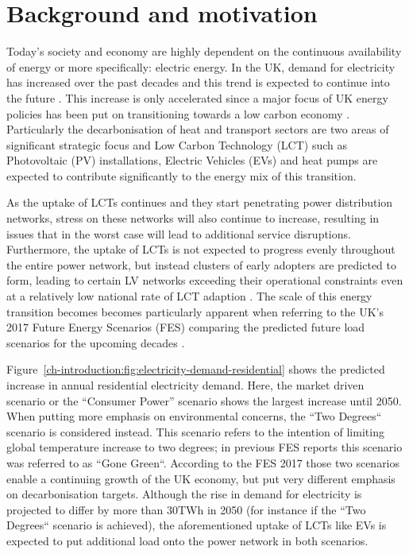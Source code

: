 \section{Background and motivation}
\label{ch-introduction:sec:background}

Today's society and economy are highly dependent on the continuous availability of energy or more specifically: electric energy.
In the UK, demand for electricity has increased over the past decades and this trend is expected to continue into the future \cite{HMGovernment2009}.
This increase is only accelerated since a major focus of UK energy policies has been put on transitioning towards a low carbon economy \cite{RoyalAcademyofEngineering2010}.
Particularly the decarbonisation of heat and transport sectors are two areas of significant strategic focus and Low Carbon Technology (LCT) such as Photovoltaic (PV) installations, Electric Vehicles (EVs) and heat pumps are expected to contribute significantly to the energy mix of this transition.


As the uptake of LCTs continues and they start penetrating power distribution networks, stress on these networks will also continue to increase, resulting in issues that in the worst case will lead to additional service disruptions.
Furthermore, the uptake of LCTs is not expected to progress evenly throughout the entire power network, but instead clusters of early adopters are predicted to form, leading to certain LV networks exceeding their operational constraints even at a relatively low national rate of LCT adaption \cite{Poghosyan2014}.
The scale of this energy transition becomes becomes particularly apparent when referring to the UK's 2017 Future Energy Scenarios (FES) comparing the predicted future load scenarios for the upcoming decades \cite{FES2017}.



Figure~\ref{ch-introduction:fig:electricity-demand-residential} shows the predicted increase in annual residential electricity demand.
Here, the market driven scenario or the ``Consumer Power'' scenario shows the largest increase until 2050.
When putting more emphasis on environmental concerns, the ``Two Degrees`` scenario is  considered instead.
This scenario refers to the intention of limiting global temperature increase to two degrees; in previous FES reports this scenario was referred to as ``Gone Green``.
According to the FES 2017 those two scenarios enable a continuing growth of the UK economy, but put very different emphasis on decarbonisation targets.
Although the rise in demand for electricity is projected to differ by more than 30TWh in 2050 (for instance if the ``Two Degrees`` scenario is achieved), the aforementioned uptake of LCTs like EVs is expected to put additional load onto the power network in both scenarios.

